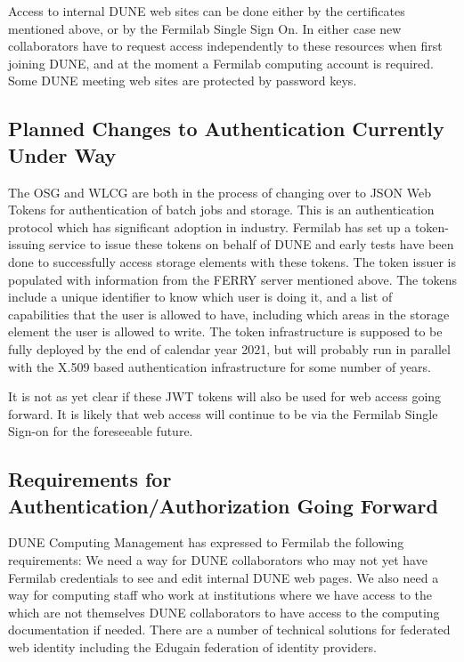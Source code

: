 Access to internal DUNE web sites can be done either by the certificates mentioned above, or by the Fermilab 
Single Sign On.  In either case new collaborators have to request access independently to these resources
when first joining DUNE, and at the moment a Fermilab computing account is required.  Some DUNE meeting web sites
are protected by password keys.

\subsection{Planned Changes to Authentication Currently Under Way}

The OSG and WLCG are both in the process of changing over to JSON Web Tokens for authentication of
batch jobs and storage. This is an authentication protocol which has significant adoption in industry.
Fermilab has set up a token-issuing service to issue these tokens on behalf of DUNE and early tests have been 
done to successfully access storage elements with these tokens.  The token issuer is populated with information 
from the FERRY server mentioned above. The tokens include a unique identifier to 
know which user is doing it, and a list of capabilities that the user is allowed to have, including which 
areas in the storage element the user is allowed to write.  The token infrastructure is supposed to 
be fully deployed by the end of calendar year 2021, but will probably run in parallel with the X.509 
based authentication infrastructure for some number of years.

It is not as yet clear if these JWT tokens will also be used for web access going forward.  It is likely 
that web access will continue to be via the Fermilab Single Sign-on for the foreseeable future.

\subsection{Requirements for Authentication/Authorization Going Forward}

DUNE Computing Management has expressed to Fermilab the following requirements:
We need a way for DUNE collaborators who may not yet have Fermilab credentials to see and edit internal DUNE 
web pages.  We also need a way for computing staff who work at institutions where we have access to the 
which are not themselves DUNE collaborators to have access to the computing documentation if needed.
There are a number of technical solutions for federated web identity including the Edugain federation
of identity providers.  






